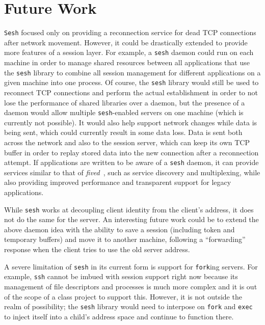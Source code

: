 \documentclass[twocolumn,11pt]{article}
\newcommand{\sesh}{\texttt{sesh}\xspace}
\newcommand{\Sesh}{\texttt{Sesh}\xspace}
\begin{document}
\section{Future Work}

\Sesh focused only on providing a reconnection service for dead TCP connections
after network movement. However, it could be drastically extended to provide
more features of a session layer. For example, a \sesh daemon could run on each
machine in order to manage shared resources between all applications that use
the \sesh library to combine all session management for different applications
on a given machine into one process. Of course, the \sesh library would still be
used to reconnect TCP connections and perform the actual establishment in order
to not lose the performance of shared libraries over a daemon, but the presence
of a daemon would allow multiple \sesh-enabled servers on one machine (which is
currently not possible). It would also help support network changes while data
is being sent, which could currently result in some data loss. Data is sent both
across the network and also to the session server, which can keep its own TCP
buffer in order to replay stored data into the new connection after a
reconnection attempt. If applications are written to be aware of a \sesh daemon,
it can provide services similar to that of \textit{fived}~\cite{wasptr-15-01},
such as service discovery and multiplexing,
while also providing improved performance and transparent support for legacy
applications.

While \sesh works at decoupling client identity from the client's address, it
does not do the same for the server. An interesting future work could be to
extend the above daemon idea with the ability to save a session (including token
and temporary buffers) and move it to another machine, following a
``forwarding'' response when the client tries to use the old server address.

A severe limitation of \sesh in its current form is support for \texttt{fork}ing
servers. For example, \texttt{ssh} cannot be imbued with session support right
now because its management of file descriptors and processes is much more
complex and it is out of the scope of a class project to support this. However,
it is not outside the realm of possibility; the \sesh library would need to
interpose on \texttt{fork} and \texttt{exec} to inject itself into a child's
address space and continue to function there.
\end{document}
